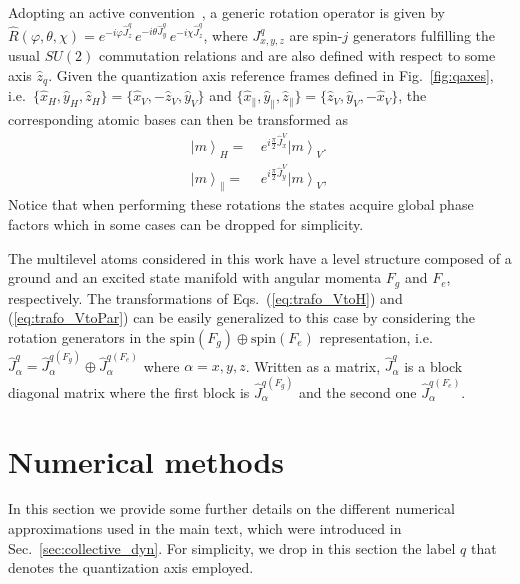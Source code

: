 \documentclass[aps,prx,superscriptaddress,twocolumn,notitlepage,nofootinbib,longbibliography]{revtex4-2}
\newcommand{\ket}[1]{\left|#1\right>}
\newcommand{\quv}{\hat{z}}
\newcommand{\qusub}{q}
\begin{document}
Adopting an active convention~\cite{brown_carrington_2003}, a generic rotation operator is given by $\hat{R}(\varphi,\theta,\chi) = e^{-i \varphi \hat{J}^{\qusub}_z}\, e^{-i \theta \hat{J}^{\qusub}_y}\, e^{-i \chi \hat{J}^{\qusub}_z}$, where $J^{\qusub}_{x,y,z}$ are spin-$j$ generators fulfilling the usual $SU(2)$ commutation relations and are also defined with respect to some axis $\quv_\qusub$. Given the quantization axis reference frames defined in Fig.~\ref{fig:qaxes}, i.e.~$\{\hat{x}_H,\hat{y}_H,\hat{z}_H\}=\{\hat{x}_V, -\hat{z}_V, \hat{y}_V\}$ and $\{\hat{x}_\parallel,\hat{y}_\parallel,\hat{z}_\parallel\}=\{\hat{z}_V, \hat{y}_V, - \hat{x}_V\}$, the corresponding atomic bases can then be transformed as
\begin{align}
    \ket{m}_H =&\, e^{i\frac{\pi}{2}\hat{J}^V_x} \ket{m}_V .
\label{eq:trafo_VtoH}\\
	\ket{m}_\parallel =&\, e^{i\frac{\pi}{2}\hat{J}^V_y} \ket{m}_V ,
\label{eq:trafo_VtoPar}
\end{align}
Notice that when performing these rotations the states acquire global phase factors which in some cases can be dropped for simplicity.

The multilevel atoms considered in this work have a level structure composed of a ground and an excited state manifold with angular momenta $F_g$ and $F_e$, respectively. The transformations of Eqs.~(\ref{eq:trafo_VtoH}) and (\ref{eq:trafo_VtoPar}) can be easily generalized to this case by considering the rotation generators in the $\text{spin}(F_g) \oplus \text{spin}(F_e)$ representation, i.e.~$\hat{J}^{\qusub}_\alpha = \hat{J}_\alpha^{\qusub (F_g)} \oplus \hat{J}_\alpha^{\qusub (F_e)}$ where $\alpha=x,y,z$. Written as a matrix, $\hat{J}^{\qusub}_\alpha$ is a block diagonal matrix where the first block is $\hat{J}_\alpha^{\qusub (F_g)}$ and the second one $\hat{J}_\alpha^{\qusub (F_e)}$.






\section{Numerical methods\label{app:methods}}

In this section we provide some further details on the different numerical approximations used in the main text, which were introduced in Sec.~\ref{sec:collective_dyn}. For simplicity, we drop in this section the label $q$ that denotes the quantization axis employed.
\end{document}
